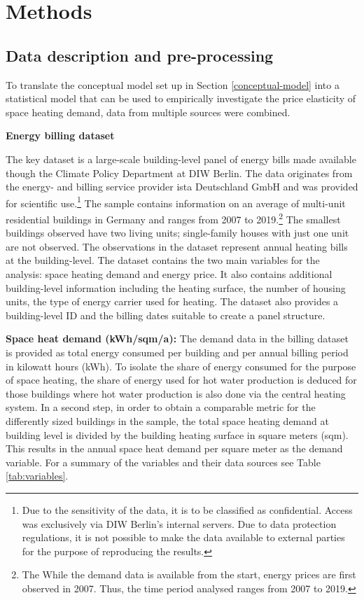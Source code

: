 \documentclass[12pt,twoside]{reedthesis}
\begin{document}
\hypertarget{methods}{%
\chapter{Methods}\label{methods}}

\hypertarget{data}{%
\section{Data description and pre-processing}\label{data}}

To translate the conceptual model set up in Section \ref{conceptual-model} into a statistical model that can be used to empirically investigate the price elasticity of space heating demand, data from multiple sources were combined.

\textbf{Energy billing dataset}

The key dataset is a large-scale building-level panel of energy bills made available though the Climate Policy Department at DIW Berlin. The data originates from the energy- and billing service provider ista Deutschland GmbH and was provided for scientific use.\footnote{Due to the sensitivity of the data, it is to be classified as confidential. Access was exclusively via DIW Berlin's internal servers. Due to data protection regulations, it is not possible to make the data available to external parties for the purpose of reproducing the results.} The sample contains information on an average of multi-unit residential buildings in Germany and ranges from 2007 to 2019.\footnote{The While the demand data is available from the start, energy prices are first observed in 2007. Thus, the time period analysed ranges from 2007 to 2019.} The smallest buildings observed have two living units; single-family houses with just one unit are not observed. The observations in the dataset represent annual heating bills at the building-level. The dataset contains the two main variables for the analysis: space heating demand and energy price. It also contains additional building-level information including the heating surface, the number of housing units, the type of energy carrier used for heating. The dataset also provides a building-level ID and the billing dates suitable to create a panel structure.

\textbf{Space heat demand (kWh/sqm/a):} The demand data in the billing dataset is provided as total energy consumed per building and per annual billing period in kilowatt hours (kWh). To isolate the share of energy consumed for the purpose of space heating, the share of energy used for hot water production is deduced for those buildings where hot water production is also done via the central heating system. In a second step, in order to obtain a comparable metric for the differently sized buildings in the sample, the total space heating demand at building level is divided by the building heating surface in square meters (sqm). This results in the annual space heat demand per square meter as the demand variable. For a summary of the variables and their data sources see Table \ref{tab:variables}.
\end{document}
